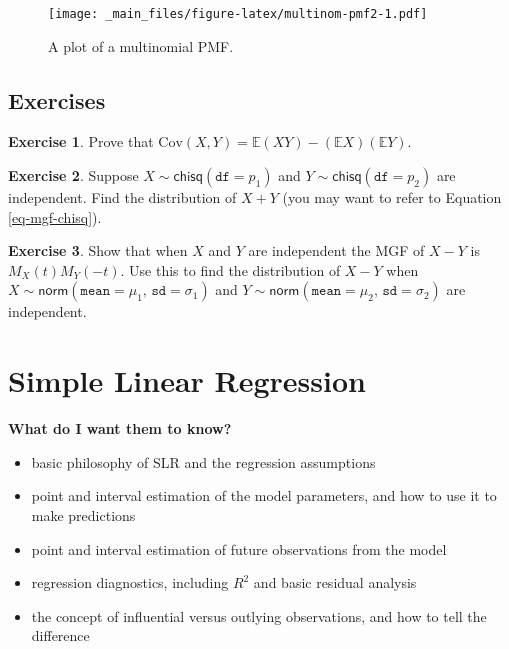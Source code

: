 \documentclass[]{book}
\providecommand{\tightlist}{%
  \setlength{\itemsep}{0pt}\setlength{\parskip}{0pt}}
\numberwithin{equation}{chapter}
\numberwithin{figure}{chapter}
\theoremstyle{plain}
\theoremstyle{definition}
\newtheorem{xca}{Exercise}[chapter]
\theoremstyle{remark}
\theoremstyle{definition}
\theoremstyle{definition}
\theoremstyle{remark}
\begin{document}
\begin{figure}[htbp]
\centering
\texttt{[image: \_main\_files/figure-latex/multinom-pmf2-1.pdf]}
\caption{\label{fig:multinom-pmf2}\small A plot of a multinomial PMF.}
\end{figure}



\section{Exercises}\label{exercises-3}

\begin{xca}
Prove that
\(\mbox{Cov}(X,Y)=\mathbb{E}(XY)-(\mathbb{E} X)(\mathbb{E} Y).\)
\end{xca}

\begin{xca}
Suppose \(X\sim\mathsf{chisq}(\mathtt{df}=p_{1})\) and
\(Y\sim\mathsf{chisq}(\mathtt{df}=p_{2})\) are independent. Find the
distribution of \(X+Y\) (you may want to refer to Equation
\eqref{eq-mgf-chisq}).
\end{xca}

\bigskip

\begin{xca}
Show that when \(X\) and \(Y\) are independent the MGF of \(X-Y\) is
\(M_{X}(t)M_{Y}(-t)\). Use this to find the distribution of \(X-Y\) when
\(X\sim\mathsf{norm}(\mathtt{mean}=\mu_{1},\,\mathtt{sd}=\sigma_{1})\)
and
\(Y\sim\mathsf{norm}(\mathtt{mean}=\mu_{2},\,\mathtt{sd}=\sigma_{2})\)
are independent.
\end{xca}

\chapter{Simple Linear Regression}\label{cha-simple-linear-regression}

\textbf{What do I want them to know?}

\begin{itemize}
\tightlist
\item
  basic philosophy of SLR and the regression assumptions
\item
  point and interval estimation of the model parameters, and how to use
  it to make predictions
\item
  point and interval estimation of future observations from the model
\item
  regression diagnostics, including \(R^{2}\) and basic residual
  analysis
\item
  the concept of influential versus outlying observations, and how to
  tell the difference
\end{itemize}
\end{document}
